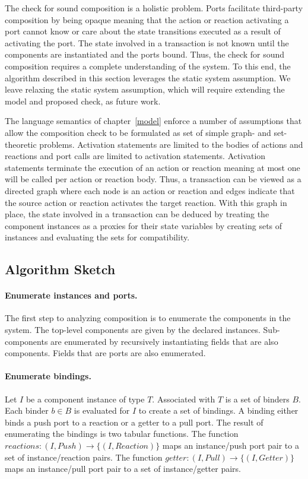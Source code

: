 The check for sound composition is a holistic problem.
Ports facilitate third-party composition by being opaque meaning that the action or reaction activating a port cannot know or care about the state transitions executed as a result of activating the port.
The state involved in a transaction is not known until the components are instantiated and the ports bound.
Thus, the check for sound composition requires a complete understanding of the system.
To this end, the algorithm described in this section leverages the static system assumption.
We leave relaxing the static system assumption, which will require extending the model and proposed check, as future work.

The language semantics of chapter~\ref{model} enforce a number of assumptions that allow the composition check to be formulated as set of simple graph- and set-theoretic problems.
Activation statements are limited to the bodies of actions and reactions and port calls are limited to activation statements.
Activation statements terminate the execution of an action or reaction meaning at most one will be called per action or reaction body.
Thus, a transaction can be viewed as a directed graph where each node is an action or reaction and edges indicate that the source action or reaction activates the target reaction.
With this graph in place, the state involved in a transaction can be deduced by treating the component instances as a proxies for their state variables by creating sets of instances and evaluating the sets for compatibility.

\subsection{Algorithm Sketch}

\paragraph{Enumerate instances and ports.}
The first step to analyzing composition is to enumerate the components in the system.
The top-level components are given by the declared instances.
Sub-components are enumerated by recursively instantiating fields that are also components.
Fields that are ports are also enumerated.

\paragraph{Enumerate bindings.}
Let $I$ be a component instance of type $T$.
Associated with $T$ is a set of binders $B$.
Each binder $b \in B$ is evaluated for $I$ to create a set of bindings.
A binding either binds a push port to a reaction or a getter to a pull port.
The result of enumerating the bindings is two tabular functions.
The function $reactions: (I,Push) \to \{(I,Reaction)\}$ maps an instance/push port pair to a set of instance/reaction pairs.
The function $getter: (I,Pull) \to \{(I,Getter)\}$ maps an instance/pull port pair to a set of instance/getter pairs.


